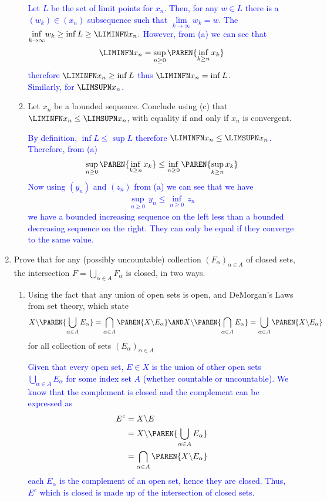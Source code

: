 \documentclass[10pt,a4paper]{report}
\newcommand{\BLUE}[1]{\textcolor{blue}{#1}}
\begin{document}
\begin{enumerate}[label=\Roman*.]
\begin{enumerate}[label=(\alph*)]
		\BLUE{Let $L$ be the set of limit points for $x_n$.  Then, for any $w \in L$ there is a $(w_k)\in (x_n)$ subsequence such that $\underset{k\to \infty}\lim w_k = w$.  The $\underset{k\to\infty}\inf w_k \ge \inf L \ge \LIMINFN x_n.$  However, from (a) we can see that 
		\begin{align*}
				\LIMINFN x_n = \sup_{n\ge 0} \PAREN{\inf_{k\ge n} x_k}		
		\end{align*}therefore $\LIMINFN x_n \ge \inf L$ thus $\LIMINFN x_n = \inf L$.\\
		Similarly, for $\LIMSUPN x_n$.
		}
		\item Let $x_n$ be a bounded sequence.  Conclude using (c) that $\LIMINFN x_n \le \LIMSUPN x_n$, with equality if and only if $x_n$ is convergent.
		
		\BLUE{By definition, $\inf L \le \sup L$ therefore $\LIMINFN x_n \le \LIMSUPN x_n$.  Therefore, from (a)
		\begin{align*}
				\sup_{n\ge 0} \PAREN{\inf_{k\ge n} x_k} \le \inf_{n\ge 0}\PAREN{\sup_{k\ge n} x_k}
		\end{align*}Now using $(y_n)$ and $(z_n)$ from (a) we can see that we have \begin{align*}
			\sup_{n\ge 0} \,y_n \le \inf_{n\ge 0}\,z_n
		\end{align*}we have a bounded increasing sequence on the left less than a bounded decreasing sequence on the right.  They can only be equal if they converge to the same value.
		}
	\end{enumerate}
	
	\item Prove that for any (possibly uncountable) collection $(F_\alpha)_{\alpha\in A}$ of closed sets, the intersection $F = \bigcup_{\alpha \in A} F_\alpha$ is closed, in two ways.
	\begin{enumerate}[label=(\alph*)]
		\item Using the fact that any union of open sets is open, and DeMorgan's Laws from set theory, which state
		\begin{align*}
			X\backslash \PAREN{\bigcup_{\alpha\in A} E_\alpha } = \bigcap_{\alpha \in A} \PAREN{X \backslash E_\alpha} \AND X\backslash\PAREN{\bigcap_{\alpha \in A} E_\alpha} = \bigcup_{\alpha\in A} \PAREN{X \backslash E_\alpha}
		\end{align*}for all collection of sets $(E_\alpha)_{\alpha\in A}$
		
		\BLUE{Given that every open set, $E\in X$ is the union of other open sets $\bigcup_{\alpha \in A} E_\alpha$ for some index set $A$ (whether countable or uncountable).  We know that the complement is closed and the complement can be expressed as
		\begin{align*}
			E^c &= X\backslash E \\
			&= X\backslash \PAREN{\bigcup_{\alpha\in A} E_\alpha }\\
			&= \bigcap_{\alpha \in A} \PAREN{X \backslash E_\alpha}
		\end{align*}each $E_\alpha$ is the complement of an open set, hence they are closed.  Thus, $E^c$ which is closed is made up of the intersection of closed sets.
		}
		

\end{enumerate}
\end{enumerate}
\end{document}

